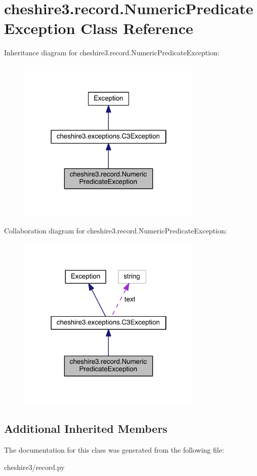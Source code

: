 \hypertarget{classcheshire3_1_1record_1_1_numeric_predicate_exception}{\section{cheshire3.\-record.\-Numeric\-Predicate\-Exception Class Reference}
\label{classcheshire3_1_1record_1_1_numeric_predicate_exception}
}


Inheritance diagram for cheshire3.\-record.\-Numeric\-Predicate\-Exception\-:
\nopagebreak
\begin{figure}[H]
\begin{center}
\leavevmode
\includegraphics[width=250pt]{classcheshire3_1_1record_1_1_numeric_predicate_exception__inherit__graph}
\end{center}
\end{figure}


Collaboration diagram for cheshire3.\-record.\-Numeric\-Predicate\-Exception\-:
\nopagebreak
\begin{figure}[H]
\begin{center}
\leavevmode
\includegraphics[width=250pt]{classcheshire3_1_1record_1_1_numeric_predicate_exception__coll__graph}
\end{center}
\end{figure}
\subsection*{Additional Inherited Members}


The documentation for this class was generated from the following file\-:\begin{DoxyCompactItemize}
\item 
cheshire3/record.\-py\end{DoxyCompactItemize}

